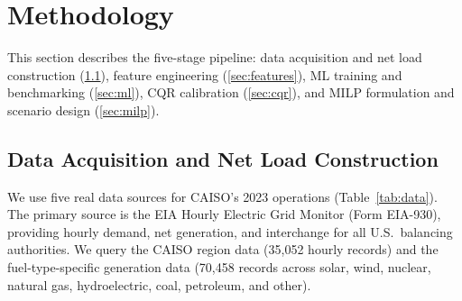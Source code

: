 \documentclass[preprint,12pt,authoryear]{elsarticle}
\begin{document}
\section{Methodology}
\label{sec:method}

This section describes the five-stage pipeline: data acquisition and net load construction (\ref{sec:data}), feature engineering (\ref{sec:features}), ML training and benchmarking (\ref{sec:ml}), CQR calibration (\ref{sec:cqr}), and MILP formulation and scenario design (\ref{sec:milp}).

\subsection{Data Acquisition and Net Load Construction}
\label{sec:data}

We use five real data sources for CAISO's 2023 operations (Table~\ref{tab:data}). The primary source is the EIA Hourly Electric Grid Monitor (Form EIA-930), providing hourly demand, net generation, and interchange for all U.S.\ balancing authorities. We query the CAISO region data (35{,}052 hourly records) and the fuel-type-specific generation data (70{,}458 records across solar, wind, nuclear, natural gas, hydroelectric, coal, petroleum, and other).

\begin{table}[htbp]
\centering
\caption{Data sources and characteristics.}
\label{tab:data}
\small
{}
\end{table}
\end{document}
